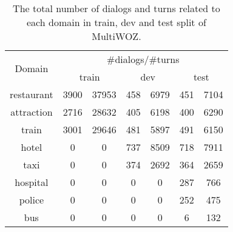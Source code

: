 \begin{table}[t]
\caption{\label{tbl:multiwoz-remix} The total number of dialogs and
  turns related to each domain in train, dev and test split of MultiWOZ.}
\begin{center}{
\setlength{\tabcolsep}{3pt}
\begin{tabular}{ccccccc}
 \toprule

\multirow{2}{*}{Domain } & \multicolumn{6}{c}{\#dialogs/\#turns}                                                \\ \cmidrule{2-7}
                         & \multicolumn{2}{c}{ train } & \multicolumn{2}{c}{ dev } & \multicolumn{2}{c}{ test } \\ \hline
restaurant               & 3900                        & 37953                     & 458 & 6979 & 451 & 7104    \\
attraction               & 2716                        & 28632                     & 405 & 6198 & 400 & 6290    \\
train                    & 3001                        & 29646                     & 481 & 5897 & 491 & 6150    \\
hotel                    & 0                           & 0                         & 737 & 8509 & 718 & 7911    \\
taxi                     & 0                           & 0                         & 374 & 2692 & 364 & 2659    \\
hospital                 & 0                           & 0                         & 0   & 0    & 287 & 766     \\
police                   & 0                           & 0                         & 0   & 0    & 252 & 475     \\
bus                      & 0                           & 0                         & 0   & 0    & 6   & 132     \\
 \bottomrule
\end{tabular}}
\end{center}
\end{table}

